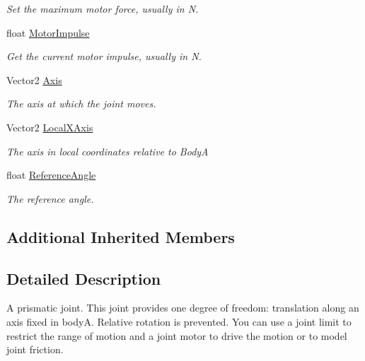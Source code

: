 \begin{DoxyCompactItemize}
\begin{DoxyCompactList}\small\item\em Set the maximum motor force, usually in N. \end{DoxyCompactList}\item 
float \hyperlink{class_farseer_physics_1_1_dynamics_1_1_joints_1_1_prismatic_joint_a8913389dfc0e78dedffe38abf569b3cf}{Motor\+Impulse}
\begin{DoxyCompactList}\small\item\em Get the current motor impulse, usually in N. \end{DoxyCompactList}\item 
Vector2 \hyperlink{class_farseer_physics_1_1_dynamics_1_1_joints_1_1_prismatic_joint_aa3b41996a09424d779a8020f2035a18a}{Axis}
\begin{DoxyCompactList}\small\item\em The axis at which the joint moves. \end{DoxyCompactList}\item 
Vector2 \hyperlink{class_farseer_physics_1_1_dynamics_1_1_joints_1_1_prismatic_joint_ab553386ce30b4abe877e6cfe784bfa05}{Local\+X\+Axis}
\begin{DoxyCompactList}\small\item\em The axis in local coordinates relative to Body\+A \end{DoxyCompactList}\item 
float \hyperlink{class_farseer_physics_1_1_dynamics_1_1_joints_1_1_prismatic_joint_a94a32ba9c7ca17df0ce648daa91ee673}{Reference\+Angle}
\begin{DoxyCompactList}\small\item\em The reference angle. \end{DoxyCompactList}\end{DoxyCompactItemize}
\subsection*{Additional Inherited Members}


\subsection{Detailed Description}
A prismatic joint. This joint provides one degree of freedom\+: translation along an axis fixed in body\+A. Relative rotation is prevented. You can use a joint limit to restrict the range of motion and a joint motor to drive the motion or to model joint friction. 



